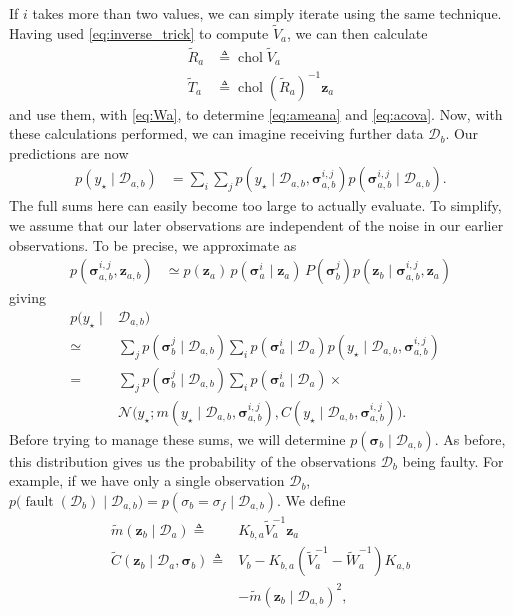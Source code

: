 \documentclass{article}
\newcommand{\given}{\ensuremath{\mid}}
\newcommand{\cm}[1]{\ensuremath{\mathcal{#1}}}
\newcommand{\bm}[1]{\ensuremath{\mathbf{#1}}}
\newcommand{\data}{\ensuremath{\cm{D}}}
\newcommand{\vect}[1]{\bm{#1}}
\newcommand{\vz}{\vect{z}}
\newcommand{\vs}{\vect{\sigma}}
\newcommand{\amean}[2]{\tilde{{m}}(#1 \given #2 )}
\newcommand{\acov}[2]{\tilde{{C}}(#1 \given #2 )}
\newcommand{\p}[2]{p(#1\given#2)}
\newcommand{\fPr}{p}
\newcommand{\Prob}[2]{\fPr(#1 \given #2 )}
\newcommand{\mean}[2]{{m}(#1\given#2)}
\newcommand{\cov}[2]{{C}(#1\given#2)}
\newcommand{\st}{_{\star}}
\newcommand{\defequal}{\triangleq}
\DeclareMathOperator{\fault}{fault}
\DeclareMathOperator{\chol}{chol}
\begin{document}
If $i$ takes more than two values, we can simply iterate using the
same technique. Having used \eqref{eq:inverse_trick} to compute
$\tilde{V}_a$, we can then calculate
\begin{align} %
 \tilde{R}_a & \defequal \chol \tilde{V}_a \\%
 \tilde{T}_a & \defequal \chol (\tilde{R}_a)^{-1} \vz_a %
\end{align}
and use them, with \eqref{eq:Wa}, to determine
\eqref{eq:ameana} and \eqref{eq:acova}.
Now, with these calculations performed, we can imagine receiving
further data $\data_b$. Our predictions are now
\begin{align*}
\p{y\st}{\data_{a,b}} & = \sum_{i} \sum_{j} \p{y\st}{\data_{a,b}, \vs^{i,j}_{a,b}} \Prob{\vs^{i,j}_{a,b}}{\data_{a,b}}.
\end{align*}
The full sums here can easily become too large to actually
evaluate. To simplify, we assume that our later observations are
independent of the noise in our earlier observations. To be precise, we approximate as
\begin{align} \label{eq:approx}
p(\vs^{i,j}_{a,b},\vz_{a,b}) & \simeq p(\vz_a)\,\Prob{\vs^i_{a}}{\vz_a}\,P(\vs^j_{b})\p{\vz_b}{\vs^{i,j}_{a,b},\vz_{a}}
\end{align}
giving
\begin{align}
p(y\st \given& \data_{a,b}) &\nonumber\\
\simeq {}& \sum_{j} \Prob{\vs^j_{b}}{\data_{a,b}}\sum_{i} \Prob{\vs^i_{a}}{\data_a} \p{y\st}{\data_{a,b}, \vs^{i,j}_{a,b}}\nonumber\\
= {}&\sum_{j} \Prob{\vs^j_{b}}{\data_{a,b}}\sum_{i} \Prob{\vs^i_{a}}{\data_a}\times {}\nonumber 
\\
& \cm{N}\bigl(y\st; \mean{y\st}{\data_{a,b}, \vs^{i,j}_{a,b}}, \cov{y\st}{\data_{a,b}, \vs^{i,j}_{a,b}}\bigr).\label{eq:sum_o_Gaussians}
\end{align}
Before trying to manage these sums, we will determine $p(\vs_b \given
\data_{a,b})$. As before, this distribution gives us the probability
of the observations $\data_b$ being faulty. For example, if we have
only a single observation $\data_b$, $
p\bigl(\fault(\data_b) \given \data_{a,b}\bigr) = \Prob{\sigma_b =
  \sigma_f}{\data_{a,b}} $. We define
\begin{align}%
\amean{\vz_b}{\data_a} \defequal {} &
K_{b,a} \tilde{V}_a^{-1} \vz_a %
\\
\acov{\vz_b}{\data_{a},\vs_b}
\defequal {} & V_b - K_{b,a}(\tilde{V}_a^{-1}-\tilde{W}_a^{-1})K_{a,b}
\nonumber\\
& - \amean{\vz_b}{\data_{a,b}}^2, %
\end{align}
\end{document}
